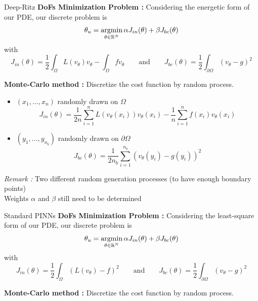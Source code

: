 \begin{frame}{Deep-Ritz}
	\small 
	\textbf{DoFs Minimization Problem :} Considering the energetic form of our PDE, our discrete problem is
	\begin{equation}
		\displaystyle \theta_u=\operatorname*{argmin}_{\theta\in\mathbb{R}^N} \alpha J_{in}(\theta)+\beta J_{bc}(\theta) \label{minpb_deepritz}
	\end{equation}
	with
	\begin{equation*}
		J_{in}(\theta)=\frac{1}{2}\int_\Omega L(v_\theta)v_\theta - \int_\Omega fv_\theta  \qquad \text{and} \qquad J_{bc}(\theta)=\frac{1}{2}\int_{\partial\Omega} (v_\theta-g)^2
	\end{equation*}	
	
	\textbf{Monte-Carlo method :} Discretize the cost function by random process.
	
	\begin{itemize}[\textbullet]
		\item $(x_1,\dots,x_n)$ randomly drawn on $\Omega$ 
		\begin{equation*}
			J_{in}(\theta)=\frac{1}{2n}\sum_{i=1}^n L(v_\theta(x_i))v_\theta(x_i) - \frac{1}{n}\sum_{i=1}^n f(x_i)v_\theta(x_i)
		\end{equation*}
		\item $(y_1,\dots,y_{n_b})$ randomly drawn on $\partial\Omega$
		\begin{equation*}
			J_{bc}(\theta)=\frac{1}{2n_b}\sum_{i=1}^{n_b} (v_\theta(y_i)-g(y_i))^2
		\end{equation*}
	\end{itemize}	

	\footnotesize
	\textit{Remark :}  Two different random generation processes (to have enough boundary points) \\
	 Weights $\alpha$ and $\beta$ still need to be determined
\end{frame}

\begin{frame}{Standard PINNs}
	\textbf{DoFs Minimization Problem :} Considering the least-square form of our PDE, our discrete problem is
	\begin{equation}
		\displaystyle \theta_u=\operatorname*{argmin}_{\theta\in\mathbb{R}^N} \alpha J_{in}(\theta)+\beta J_{bc}(\theta) \label{minpb_pinns}
	\end{equation}
	with
	\begin{equation*}
		J_{in}(\theta)=\frac{1}{2}\int_\Omega (L(v_\theta) - f)^2  \qquad \text{and} \qquad J_{bc}(\theta)=\frac{1}{2}\int_{\partial\Omega} (v_\theta-g)^2
	\end{equation*}	
	
	\textbf{Monte-Carlo method :} Discretize the cost function by random process.
\end{frame}

